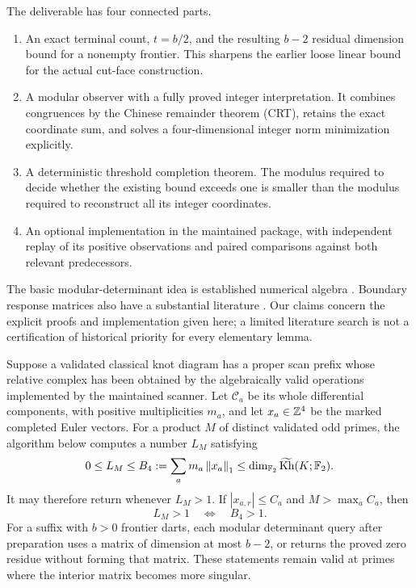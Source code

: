 The deliverable has four connected parts.

\begin{enumerate}
\item An exact terminal count, $t=b/2$, and the resulting $b-2$ residual
dimension bound for a nonempty frontier. This sharpens the earlier loose linear
bound for the actual cut-face construction.
\item A modular observer with a fully proved integer interpretation. It combines
congruences by the Chinese remainder theorem (CRT), retains the exact coordinate
sum, and solves a four-dimensional integer norm minimization explicitly.
\item A deterministic threshold completion theorem. The modulus required to
decide whether the existing bound exceeds one is smaller than the modulus
required to reconstruct all its integer coordinates.
\item An optional implementation in the maintained package, with independent replay of its
positive observations and paired comparisons against both relevant predecessors.
\end{enumerate}

The basic modular-determinant idea is established numerical algebra
\cite{dumasurbanska}. Boundary response matrices also have a substantial
literature \cite{kenyonwilson}. Our claims concern the explicit proofs and
implementation given here; a limited literature search is not a certification
of historical priority for every elementary lemma.

\begin{samepage}
\begin{theorem}
\label{thm:main}
Suppose a validated classical knot diagram has a proper scan prefix whose
relative complex has been obtained by the algebraically valid operations
implemented by the maintained scanner. Let $\mathcal C_a$ be its whole differential components, with positive
multiplicities $m_a$, and let $x_a\in\mathbb Z^4$ be the marked completed Euler vectors.
For a product $M$ of distinct validated odd primes, the algorithm below computes
a number $L_M$ satisfying
\[
 0\le L_M\le B_4:=\sum_a m_a\left\lVert x_a\right\rVert_1
 \le \dim_{\mathbb F_2}\widetilde{\operatorname{Kh}}(K;\mathbb F_2).
\]
It may therefore return  whenever $L_M>1$.
If $|x_{a,r}|\le C_a$ and $M>\max_a C_a$, then
\[
             L_M>1\quad\Longleftrightarrow\quad B_4>1.
\]
For a suffix with $b>0$ frontier darts, each modular determinant query after
preparation uses a matrix of dimension at most $b-2$, or returns the proved
zero residue without forming that matrix. These statements remain valid at
primes where the interior matrix becomes more singular.
\end{theorem}
\end{samepage}

